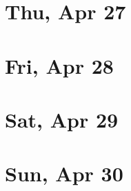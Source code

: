 	\section{Thu, Apr 27}
		
		
	\section{Fri, Apr 28}
		
		
	\section{Sat, Apr 29}
		
		
	\section{Sun, Apr 30}
		
		
